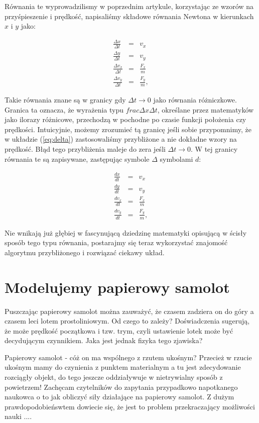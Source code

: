 \documentclass[10pt,twocolumn]{article}
\begin{document}
Równania te wyprowadzilismy w poprzednim artykule, korzystając ze
wzorów na przyśpieszenie i prędkość, napisaliśmy składowe równania
Newtona w kierunkach $x$ i $y$ jako:
 
\begin{eqnarray}
\frac{ \Delta x}{\Delta t} &=& v_x \\ \nonumber
\frac{ \Delta y}{\Delta t} &=& v_y \\ \nonumber
\frac{ \Delta v_x}{\Delta t} &=& \frac{F_x}{m}\\ \nonumber
\frac{ \Delta v_y}{\Delta t} &=& \frac{F_y}{m},
\label{eq:delta} 
\end{eqnarray}

Takie równania znane są w granicy gdy $\Delta t\to 0$ jako równania
różniczkowe. Granica ta oznacza, że wyrażenia typu $ frac{ \Delta
  x}{\Delta t}$, określane przez matematyków jako ilorazy różnicowe,
przechodzą w pochodne po czasie funkcji położenia czy
prędkości. Intuicyjnie, możemy zrozumieć tą granicę jeśli sobie
przypomnimy, że w układzie (\ref{eq:delta}) zastosowaliśmy przybliżone
a nie dokładne wzory na prędkość. Błąd tego przybliżenia maleje do
zera jeśli $ \Delta t\to 0$. W tej granicy równania te są zapisywane,
zastępując symbole $\Delta$ symbolami $d$:

\begin{eqnarray}
\frac{ dx}{dt} &=& v_x \\ \nonumber
\frac{ dy}{dt} &=& v_y \\ \nonumber
\frac{ dv_x}{dt} &=& \frac{F_x}{m}\\ \nonumber
\frac{ dv_y}{dt} &=& \frac{F_y}{m},
\label{eq:ode} 
\end{eqnarray}

Nie wnikają już głębiej w fascynującą dziedzinę matematyki opisującą w
ścisły sposób tego typu równania, postarajmy się teraz wykorzystać
znajomość algorytmu przybliżonego i rozwiązać ciekawy  układ.


\section{Modelujemy papierowy samolot }

Puszczając papierowy samolot można zauważyć, że czasem zadziera on do
góry a czasem leci lotem prostoliniowym. Od czego to zależy?
Doświadczenia sugerują, że może prędkość początkowa i tzw. trym, czyli
ustawienie lotek może być decydującym czynnikiem. Jaka jest jednak
fizyka tego zjawiska?

Papierowy samolot - cóż on ma wspólnego z rzutem ukośnym? Przecież w
rzucie ukośnym mamy do czynienia z punktem materialnym a tu jest
zdecydowanie rozciągły objekt, do tego jeszcze oddziaływuje w
nietrywialny sposób z powietrzem! Zachęcam czytelników do zapytania
przypadkowo napotkanego naukowca o to jak obliczyć siły działające na
papierowy samolot. Z dużym prawdopodobieńswtem dowiecie się, że jest
to problem przekraczający możliwości nauki ....
\end{document}
